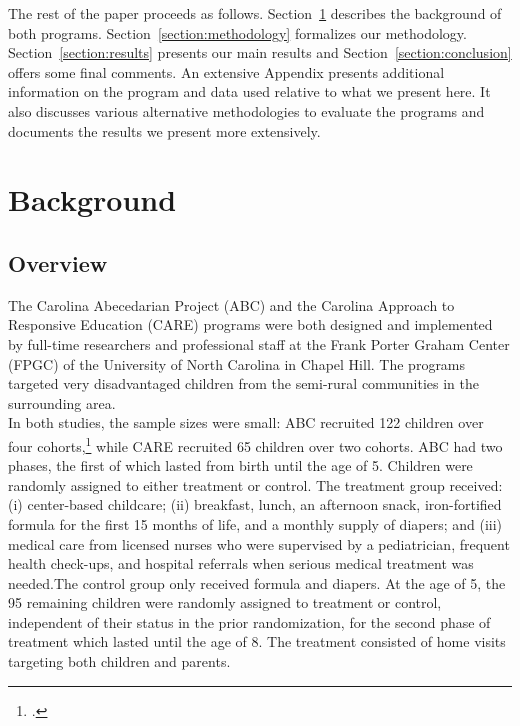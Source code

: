 \noindent The rest of the paper proceeds as follows. Section~\ref{section:background} describes the background of both programs. Section~\ref{section:methodology} formalizes our methodology. Section~\ref{section:results} presents our main results and Section~\ref{section:conclusion} offers some final comments. An extensive Appendix presents additional information on the program and data used relative to what we present here. It also discusses various alternative methodologies to evaluate the programs and documents the results we present more extensively. 

\section{Background} \label{section:background}
\subsection{Overview}

\noindent The Carolina Abecedarian Project (ABC) and the Carolina Approach to Responsive Education (CARE) programs were both designed and implemented by full-time researchers and professional staff at the Frank Porter Graham Center (FPGC) of the University of North Carolina in Chapel Hill. The programs targeted very disadvantaged children from the semi-rural communities in the surrounding area.\\

\noindent In both studies, the sample sizes were small: ABC recruited 122 children over four cohorts,\footnote{\citet{Ramey_Collier_etal_1976_CarolinaAbecedarianProject}.} while CARE recruited 65 children over two cohorts. ABC had two phases, the first of which lasted from birth until the age of 5. Children were randomly assigned to either treatment or control. The treatment group received: (i) center-based childcare; (ii) breakfast, lunch, an afternoon snack, iron-fortified formula for the first 15 months of life, and a monthly supply of diapers; and (iii) medical care from licensed nurses who were supervised by a pediatrician, frequent health check-ups, and hospital referrals when serious medical treatment was needed.The control group only received formula and diapers. At the age of 5, the 95 remaining children were randomly assigned to treatment or control, independent of their status in the prior randomization, for the second phase of treatment which lasted until the age of 8. The treatment consisted of home visits targeting both children and parents.\\ 


